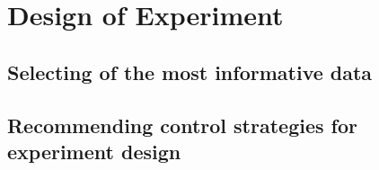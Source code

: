 \section{Design of Experiment}
\label{S:doe}


\subsection{Selecting of the most informative data}

\subsection{Recommending control strategies for experiment design}
